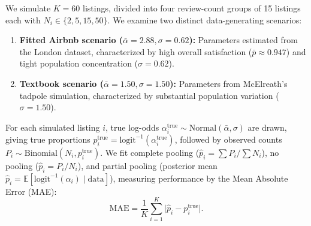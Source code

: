 \documentclass[11pt,a4paper]{article}
\begin{document}
We simulate $K = 60$ listings, divided into four review-count groups of 15 listings each with $N_i \in \{2, 5, 15, 50\}$. We examine two distinct data-generating scenarios:
\begin{enumerate}
  \item \textbf{Fitted Airbnb scenario ($\bar\alpha = 2.88, \sigma = 0.62$):} Parameters estimated from the London dataset, characterized by high overall satisfaction ($\bar{p} \approx 0.947$) and tight population concentration ($\sigma = 0.62$).
  \item \textbf{Textbook scenario ($\bar\alpha = 1.50, \sigma = 1.50$):} Parameters from McElreath's tadpole simulation, characterized by substantial population variation ($\sigma = 1.50$).
\end{enumerate}

For each simulated listing $i$, true log-odds $\alpha_i^{\text{true}} \sim \text{Normal}(\bar\alpha, \sigma)$ are drawn, giving true proportions $p_i^{\text{true}} = \text{logit}^{-1}(\alpha_i^{\text{true}})$, followed by observed counts $P_i \sim \text{Binomial}(N_i, p_i^{\text{true}})$. We fit complete pooling ($\hat{p}_i = \sum P_i / \sum N_i$), no pooling ($\hat{p}_i = P_i / N_i$), and partial pooling (posterior mean $\hat{p}_i = \mathbb{E}[\text{logit}^{-1}(\alpha_i) \mid \text{data}]$), measuring performance by the Mean Absolute Error (MAE):
\[
  \text{MAE} = \frac{1}{K} \sum_{i=1}^K \big|\hat{p}_i - p_i^{\text{true}}\big|.
\]
\end{document}
